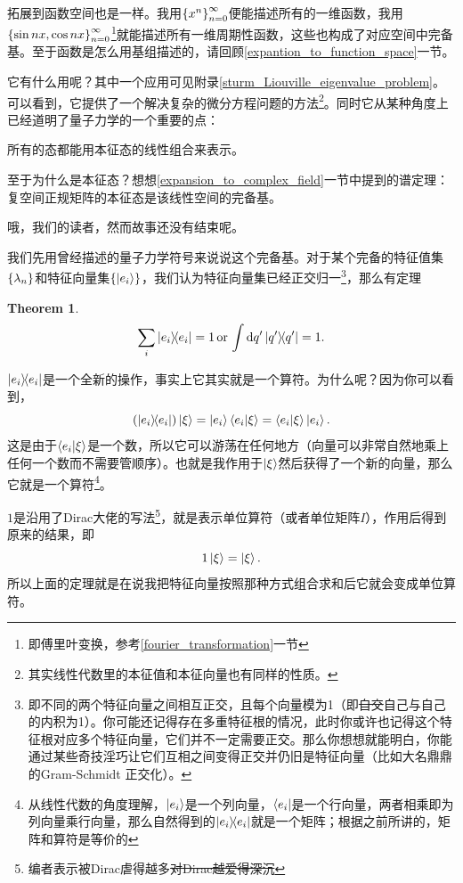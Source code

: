 \documentclass[12pt,a4paper,openany,twoside]{book}
\newtheorem{theorem}{Theorem}[section]
\numberwithin{equation}{section}
\begin{document}
    拓展到函数空间也是一样。我用$\qty{x^n}_{n=0}^\infty$便能描述所有的一维函数，我用$\qty{\sin{nx},\cos{nx}}_{n=0}^\infty$\footnote{即傅里叶变换，参考\ref{fourier_transformation}一节}就能描述所有一维周期性函数，这些也构成了对应空间中完备基。至于函数是怎么用基组描述的，请回顾\ref{expantion_to_function_space}一节。

    它有什么用呢？其中一个应用可见附录\ref{sturm_Liouville_eigenvalue_problem}。可以看到，它提供了一个解决复杂的微分方程问题的方法\footnote{其实线性代数里的本征值和本征向量也有同样的性质。}。同时它从某种角度上已经道明了量子力学的一个重要的点：
    \begin{center}
      所有的态都能用本征态的线性组合来表示。
    \end{center}
    至于为什么是本征态？想想\ref{expansion_to_complex_field}一节中提到的谱定理：复空间正规矩阵的本征态是该线性空间的完备基。

    哦，我们的读者，然而故事还没有结束呢。

    我们先用曾经描述的量子力学符号来说说这个完备基。对于某个完备的特征值集$\qty{\lambda_n}$和特征向量集$\qty{\ket{e_i}}$，我们认为特征向量集已经正交归一\footnote{即不同的两个特征向量之间相互正交，且每个向量模为1（即\sout{自交}自己与自己的内积为1）。你可能还记得存在多重特征根的情况，此时你或许也记得这个特征根对应多个特征向量，它们并不一定需要正交。那么你想想就能明白，你能通过某些奇技淫巧让它们互相之间变得正交并仍旧是特征向量（比如大名鼎鼎的Gram-Schmidt 正交化）。}，那么有定理
    \begin{theorem}
      \begin{equation}
        \sum_i{\dyad{e_i}}=1\,\text{or}\,\int{\dd{q'}\dyad{q'}}=1.
      \end{equation}
    \end{theorem}

    $\dyad{e_i}$是一个全新的操作，事实上它其实就是一个算符。为什么呢？因为你可以看到，
    \begin{equation}
      \qty(\dyad{e_i})\ket{\xi}=\ket{e_i}\bra{e_i}\ket{\xi}=\bra{e_i}\ket{\xi}\ket{e_i}.
      \label{ ket bra }
    \end{equation}
    这是由于$\bra{e_i}\ket{\xi}$是一个数，所以它可以游荡在任何地方（向量可以非常自然地乘上任何一个数而不需要管顺序）。也就是我作用于$\ket{\xi}$然后获得了一个新的向量，那么它就是一个算符\footnote{从线性代数的角度理解，$\ket{e_i}$是一个列向量，$\bra{e_i}$是一个行向量，两者相乘即为列向量乘行向量，那么自然得到的$\dyad{e_i}$就是一个矩阵；根据之前所讲的，矩阵和算符是等价的}。

    $1$是沿用了Dirac大佬的写法\footnote{编者表示被Dirac虐得越多\sout{对Dirac越爱得深沉}}，就是表示单位算符（或者单位矩阵$I$），作用后得到原来的结果，即
    \begin{equation}
      1\ket{\xi}=\ket{\xi}.
    \end{equation}
    所以上面的定理就是在说我把特征向量按照那种方式组合求和后它就会变成单位算符。
\end{document}
